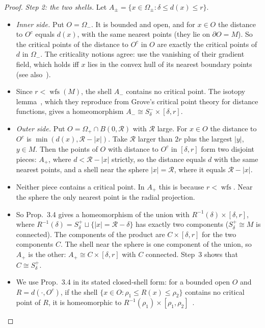 \documentclass[preprint,12pt]{elsarticle}
\theoremstyle{definition}
\theoremstyle{remark}
\newcommand{\wfs}{\operatorname{wfs}}
\begin{document}
\begin{proof}
\emph{Step 2: the two shells.} Let $A_\pm=\{x\in\Omega_\pm:\delta\le d(x)\le r\}$.
\begin{itemize}
\item \emph{Inner side.} Put $O=\Omega_-$. It is bounded and open, and for $x\in O$ the distance to $O^c$ equals
$d(x)$, with the same nearest points (they lie on $\partial O=M$). So the critical points of the distance to $O^c$
in $O$ are exactly the critical points of $d$ in $\Omega_-$. The criticality notions agree:
\cite{ChazalLieutier07} use the vanishing of their gradient field, which holds iff $x$ lies in the convex hull of
its nearest boundary points~\cite[Lemma~2.2]{ChazalLieutier07} (see also~\cite[\S2.2]{CCSL09dcg}).
\item Since $r<\wfs(M)$, the shell $A_-$ contains no critical point. The isotopy lemma~\cite[Prop.~3.4]{ChazalLieutier07}, which they reproduce from
Grove's critical point theory for distance functions, gives a homeomorphism $A_-\cong S^-_\delta\times[\delta,r]$.
\item \emph{Outer side.} Put $O=\Omega_+\cap B(0,\mathcal R)$ with $\mathcal R$ large. For $x\in O$ the distance to
$O^c$ is $\min(d(x),\mathcal R-|x|)$. Take $\mathcal R$ larger than $2r$ plus the largest $|y|$, $y\in M$. Then the
points of $O$ with distance to $O^c$ in $[\delta,r]$ form two disjoint pieces: $A_+$, where $d<\mathcal R-|x|$ strictly, so
the distance equals $d$ with the same nearest points,
and a shell near the sphere $|x|=\mathcal R$, where it equals $\mathcal R-|x|$.
\item Neither piece contains a critical point. In $A_+$ this is because $r<\wfs$. Near the sphere the only nearest
point is the radial projection.
\item So Prop.~3.4 gives a homeomorphism of the union with $R^{-1}(\delta)\times[\delta,r]$, where
$R^{-1}(\delta)=S^+_\delta\sqcup\{|x|=\mathcal R-\delta\}$ has exactly two components ($S^+_\delta\cong M$ is connected).
The components of the product are $C\times[\delta,r]$ for the two components $C$. The shell near the sphere is one
component of the union, so $A_+$ is the other: $A_+\cong C\times[\delta,r]$ with $C$ connected. Step~3 shows that
$C\cong S^+_\delta$.
\item We use Prop.~3.4 in its stated closed-shell form: for a bounded open $O$ and $R=d(\cdot,O^c)$, if the shell
$\{x\in O:\rho_1\le R(x)\le\rho_2\}$ contains no critical point of $R$, it is homeomorphic to
$R^{-1}(\rho_1)\times[\rho_1,\rho_2]$~\cite[Prop.~3.4]{ChazalLieutier07}.
\end{itemize}


\end{proof}
\end{document}
